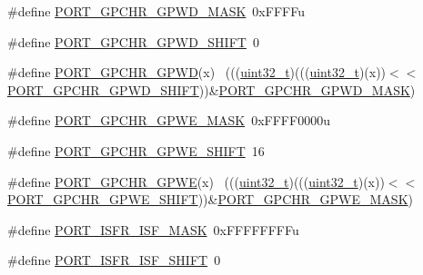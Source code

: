 \begin{DoxyCompactItemize}
\item 
\#define \hyperlink{group___p_o_r_t___register___masks_ga4f288d1140184d41384f459c263d6e63}{P\+O\+R\+T\+\_\+\+G\+P\+C\+H\+R\+\_\+\+G\+P\+W\+D\+\_\+\+M\+A\+SK}~0x\+F\+F\+F\+Fu
\item 
\#define \hyperlink{group___p_o_r_t___register___masks_gab4464bb98b737fbf75d42682fef3c09c}{P\+O\+R\+T\+\_\+\+G\+P\+C\+H\+R\+\_\+\+G\+P\+W\+D\+\_\+\+S\+H\+I\+FT}~0
\item 
\#define \hyperlink{group___p_o_r_t___register___masks_ga4bcc0d29943f201d35379c59dced6f5a}{P\+O\+R\+T\+\_\+\+G\+P\+C\+H\+R\+\_\+\+G\+P\+WD}(x)                                          ~(((\hyperlink{_p_e___types_8h_a33594304e786b158f3fb30289278f5af}{uint32\+\_\+t})(((\hyperlink{_p_e___types_8h_a33594304e786b158f3fb30289278f5af}{uint32\+\_\+t})(x))$<$$<$\hyperlink{group___p_o_r_t___register___masks_gab4464bb98b737fbf75d42682fef3c09c}{P\+O\+R\+T\+\_\+\+G\+P\+C\+H\+R\+\_\+\+G\+P\+W\+D\+\_\+\+S\+H\+I\+FT}))\&\hyperlink{group___p_o_r_t___register___masks_ga4f288d1140184d41384f459c263d6e63}{P\+O\+R\+T\+\_\+\+G\+P\+C\+H\+R\+\_\+\+G\+P\+W\+D\+\_\+\+M\+A\+SK})
\item 
\#define \hyperlink{group___p_o_r_t___register___masks_ga5e60b77e9d69fc09654c8034e31df7b5}{P\+O\+R\+T\+\_\+\+G\+P\+C\+H\+R\+\_\+\+G\+P\+W\+E\+\_\+\+M\+A\+SK}~0x\+F\+F\+F\+F0000u
\item 
\#define \hyperlink{group___p_o_r_t___register___masks_gacbc69d159ff1e697736d296bbc95566d}{P\+O\+R\+T\+\_\+\+G\+P\+C\+H\+R\+\_\+\+G\+P\+W\+E\+\_\+\+S\+H\+I\+FT}~16
\item 
\#define \hyperlink{group___p_o_r_t___register___masks_gae9cf8d5289e6249274584e60f984663b}{P\+O\+R\+T\+\_\+\+G\+P\+C\+H\+R\+\_\+\+G\+P\+WE}(x)                                          ~(((\hyperlink{_p_e___types_8h_a33594304e786b158f3fb30289278f5af}{uint32\+\_\+t})(((\hyperlink{_p_e___types_8h_a33594304e786b158f3fb30289278f5af}{uint32\+\_\+t})(x))$<$$<$\hyperlink{group___p_o_r_t___register___masks_gacbc69d159ff1e697736d296bbc95566d}{P\+O\+R\+T\+\_\+\+G\+P\+C\+H\+R\+\_\+\+G\+P\+W\+E\+\_\+\+S\+H\+I\+FT}))\&\hyperlink{group___p_o_r_t___register___masks_ga5e60b77e9d69fc09654c8034e31df7b5}{P\+O\+R\+T\+\_\+\+G\+P\+C\+H\+R\+\_\+\+G\+P\+W\+E\+\_\+\+M\+A\+SK})
\item 
\#define \hyperlink{group___p_o_r_t___register___masks_gabb5d188f3dfe38f0d8bbb870e81fb7e3}{P\+O\+R\+T\+\_\+\+I\+S\+F\+R\+\_\+\+I\+S\+F\+\_\+\+M\+A\+SK}~0x\+F\+F\+F\+F\+F\+F\+F\+Fu
\item 
\#define \hyperlink{group___p_o_r_t___register___masks_ga678f290447622562272513d57eb2bf78}{P\+O\+R\+T\+\_\+\+I\+S\+F\+R\+\_\+\+I\+S\+F\+\_\+\+S\+H\+I\+FT}~0

\end{DoxyCompactItemize}
